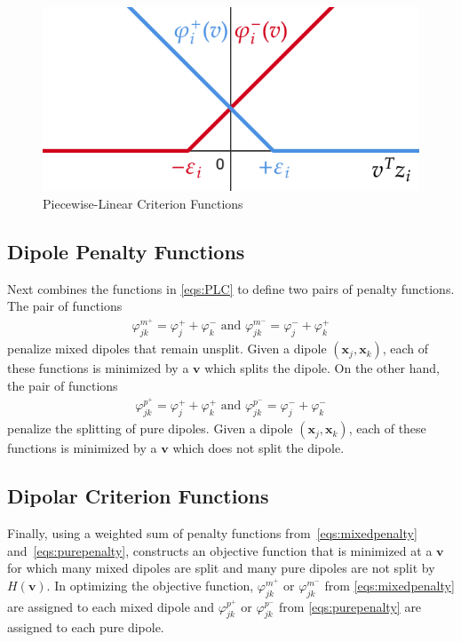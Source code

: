 \documentclass[sn-mathphys]{sn-jnl}%
\theoremstyle{thmstyleone}%
\theoremstyle{thmstyletwo}%
\theoremstyle{thmstylethree}%
\begin{document}
\begin{figure}[h]
	\centering
        \includegraphics[height=.20\textwidth]{piecewiselinear}
        \caption{Piecewise-Linear Criterion Functions} \label{fig:1}
        \captionsetup{justification=centering}
      \end{figure}


\subsection{Dipole Penalty Functions} \label{sec:DPF}

Next \cite{kretowska} combines the functions in \eqref{eqs:PLC} to define two pairs of penalty functions. The pair of functions
\begin{align}
	\varphi^{m^+}_{jk} = \varphi^+_j + \varphi^-_k \text{ and } \varphi^{m^-}_{jk} = \varphi^-_j + \varphi^+_k  \label{eqs:mixedpenalty}
\end{align} penalize mixed dipoles that remain unsplit. Given a dipole $(\mathbf{x}_j, \mathbf{x}_k)$, each of these functions is minimized by a $\mathbf{v}$ which splits the dipole. On the other hand, the pair of functions
\begin{align}
	\varphi^{p^+}_{jk} = \varphi^+_j + \varphi^+_k \text{ and } \varphi^{p^-}_{jk} = \varphi^-_j + \varphi^-_k \label{eqs:purepenalty}
\end{align} penalize the splitting of pure dipoles. Given a dipole $(\mathbf{x}_j, \mathbf{x}_k)$, each of these functions is minimized by a $\mathbf{v}$ which does not split the dipole.


\subsection{Dipolar Criterion Functions} \label{sec:DCF}

Finally, using a weighted sum of penalty functions from~\eqref{eqs:mixedpenalty} and~\eqref{eqs:purepenalty}, \cite{kretowska} constructs an objective function that is minimized at a $\mathbf{v}$ for which many mixed dipoles are split and many pure dipoles are not split by $H(\mathbf{v})$. In optimizing the objective function, $\varphi^{m^+}_{jk}$ or $\varphi^{m^-}_{jk}$ from \eqref{eqs:mixedpenalty} are assigned to each mixed dipole and $\varphi^{p^+}_{jk}$ or $\varphi^{p^-}_{jk}$ from \eqref{eqs:purepenalty} are assigned to each pure dipole.
\end{document}
